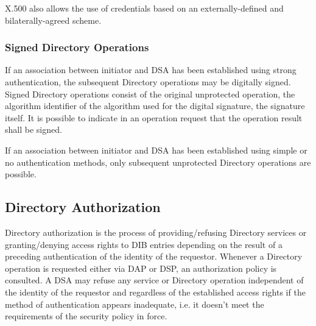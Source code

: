 X.500 also allows the use of credentials based on an externally-defined and 
bilaterally-agreed scheme.


\subsubsection{Signed Directory Operations}


If an association between initiator and DSA has been established using strong
authentication, the subsequent Directory operations may be digitally signed.
Signed Directory operations consist of
\bi
\m the original unprotected operation,
\m the algorithm identifier of the algorithm used for the digital signature,
\m the signature itself.
\ei
It is possible to indicate in an operation request that the operation result
shall be signed.

If an association between initiator and DSA has been established using simple
or no authentication methods, only subsequent unprotected Directory operations 
are possible.


\subsection{Directory Authorization}
\label{authorization}


Directory authorization is the process of providing/refusing Directory services 
or granting/denying access rights to DIB entries depending on the result of a
preceding authentication of the identity of the requestor. Whenever a Directory
operation is requested either via DAP or DSP, an authorization policy is consulted.
A DSA may refuse any service or Directory operation independent of the identity of 
the requestor and regardless of the established access rights if the method of 
authentication appears inadequate, i.e. it doesn't meet the requirements of the
security policy in force.

